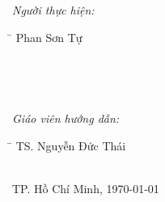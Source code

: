\begin{titlepage}
\begin{minipage}{0.5\textwidth}
\begin{flushleft} \large
\emph{Người thực hiện:}
\begin{tabbing}
\hspace{4cm}\= \kill
Phan Sơn Tự
\end{tabbing}
\end{flushleft}
\end{minipage}
~
\begin{minipage}{0.2\textwidth}
\end{minipage}
~
\begin{minipage}{0.4\textwidth}
\begin{flushleft} \large
\emph{Giáo viên hướng dẫn:}\\
\begin{tabbing}
\hspace{4cm}\= \kill
TS. Nguyễn Đức Thái
\end{tabbing}
\end{flushleft}
\end{minipage}\\[4cm]



{\large TP. Hồ Chí Minh, \MakeLowercase{\today}}\\[3cm] %


 

\vfill %

\end{titlepage}
